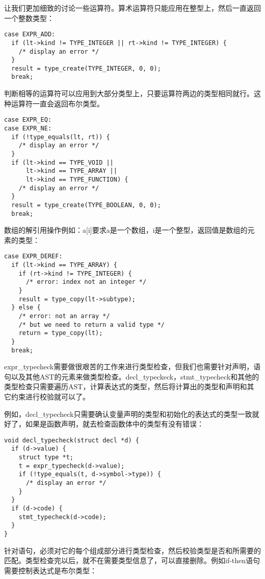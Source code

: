 \documentclass[cn,11pt,chinese]{elegantbook}
\begin{document}
让我们更加细致的讨论一些运算符。算术运算符只能应用在整型上，然后一直返回一个整数类型：

\begin{verbatim}
case EXPR_ADD:
  if (lt->kind != TYPE_INTEGER || rt->kind != TYPE_INTEGER) {
    /* display an error */
  }
  result = type_create(TYPE_INTEGER, 0, 0);
  break;
\end{verbatim}

判断相等的运算符可以应用到大部分类型上，只要运算符两边的类型相同就行。这种运算符一直会返回布尔类型。

\begin{verbatim}
case EXPR_EQ:
case EXPR_NE:
  if (!type_equals(lt, rt)) {
    /* display an error */
  }
  if (lt->kind == TYPE_VOID ||
      lt->kind == TYPE_ARRAY ||
      lt->kind == TYPE_FUNCTION) {
    /* display an error */
  }
  result = type_create(TYPE_BOOLEAN, 0, 0);
  break;
\end{verbatim}

数组的解引用操作例如：a[i]要求a是一个数组，i是一个整型，返回值是数组的元素的类型：

\begin{verbatim}
case EXPR_DEREF:
  if (lt->kind == TYPE_ARRAY) {
    if (rt->kind != TYPE_INTEGER) {
      /* error: index not an integer */
    }
    result = type_copy(lt->subtype);
  } else {
    /* error: not an array */
    /* but we need to return a valid type */
    return = type_copy(lt);
  }
  break;
\end{verbatim}

expr\_typecheck需要做很艰苦的工作来进行类型检查，但我们也需要针对声明，语句以及其他AST的元素来做类型检查。decl\_typeckeck，stmt\_typecheck和其他的类型检查只需要遍历AST，计算表达式的类型，然后将计算出的类型和声明和其它约束进行校验就可以了。

例如，decl\_typecheck只需要确认变量声明的类型和初始化的表达式的类型一致就好了，如果是函数声明，就去检查函数体中的类型有没有错误：

\begin{verbatim}
void decl_typecheck(struct decl *d) {
  if (d->value) {
    struct type *t;
    t = expr_typecheck(d->value);
    if (!type_equals(t, d->symbol->type)) {
      /* display an error */
    }
  }
  if (d->code) {
    stmt_typecheck(d->code);
  }
}
\end{verbatim}

针对语句，必须对它的每个组成部分进行类型检查，然后校验类型是否和所需要的匹配。类型检查完以后，就不在需要类型信息了，可以直接删除。例如if-then语句需要控制表达式是布尔类型：
\end{document}
